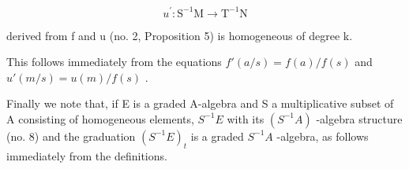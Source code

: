 \[
u ^ {\prime} \colon \mathrm{S} ^ {- 1} \mathrm{M} \rightarrow \mathrm{T} ^ {- 1} \mathrm{N}
\]

derived from f and u (no. 2, Proposition 5) is homogeneous of degree k.

This follows immediately from the equations \(f'(a / s) = f(a) / f(s)\) and \(u'(m / s) = u(m) / f(s)\) .

Finally we note that, if E is a graded A-algebra and S a multiplicative subset of A consisting of homogeneous elements, \(S^{-1}E\) with its \((S^{-1}A)\) -algebra structure (no. 8) and the graduation \((S^{-1}E)_{t}\) is a graded \(S^{-1}A\) -algebra, as follows immediately from the definitions.

